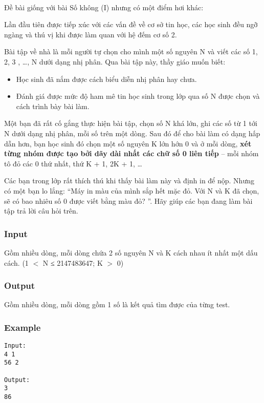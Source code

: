

 

Đề bài giống với bài Số không (I) nhưng có một điểm hơi khác:

Lần đầu tiên được tiếp xúc với các vấn đề về cơ sở tin học, các học sinh đều ngỡ ngàng và thú vị khi được làm quan với hệ đếm cơ số 2.

Bài tập về nhà là mỗi người tự chọn cho mình một số nguyên N và viết các số 1, 2, 3 , …, N dưới dạng nhị phân. Qua bài tập này, thầy giáo muốn biết:
\begin{itemize}
	\item Học sinh đã nắm được cách biểu diễn nhị phân hay chưa.
	\item Đánh giá được mức độ ham mê tin học sinh trong lớp qua số N được chọn và cách trình bày bài làm.
\end{itemize}

Một bạn đã rất cố gắng thực hiện bài tập, chọn số N khá lớn, ghi các số từ 1 tới N dưới dạng nhị phân, mỗi số trên một dòng. Sau đó để cho bài làm có dạng hấp dẫn hơn, bạn học sinh đó chọn một số nguyên K lớn hớn 0 và ở mỗi dòng, \textbf{xét từng nhóm được tạo bởi dãy dài nhất các chữ số 0 liên tiếp} – mỗi nhóm tô đỏ các 0 thứ nhất, thứ K + 1, 2K + 1, …

Các bạn trong lớp rất thích thú khi thấy bài làm này và định in để nộp. Nhưng có một bạn lo lắng: “Máy in màu của mình sắp hết mặc đỏ. Với N và K đã chọn, sẽ có bao nhiêu số 0 được viết bằng màu đỏ? ”. Hãy giúp các bạn đang làm bài tập trả lời câu hỏi trên.

\subsubsection{Input}

Gồm nhiều dòng, mỗi dòng chứa 2 số nguyên N và K cách nhau ít nhất một dấu cách. (1 $<$ N ≤ 2147483647; K $>$ 0)

\subsubsection{Output}

Gồm nhiều dòng, mỗi dòng gồm 1 số là kết quả tìm được của từng test.

\subsubsection{Example}
\begin{verbatim}
Input:
4 1
56 2

Output:
3
86
\end{verbatim}